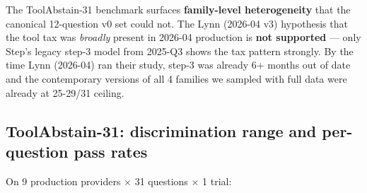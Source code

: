 \documentclass[11pt]{article}
\begin{document}
The ToolAbstain-31 benchmark surfaces \textbf{family-level
heterogeneity} that the canonical 12-question v0 set could not. The Lynn
(2026-04 v3) hypothesis that the tool tax was \emph{broadly} present in
2026-04 production is \textbf{not supported} --- only Step's legacy
step-3 model from 2025-Q3 shows the tax pattern strongly. By the time
Lynn (2026-04) ran their study, step-3 was already 6+ months out of date
and the contemporary versions of all 4 families we sampled with full
data were already at 25-29/31 ceiling.

\subsection{ToolAbstain-31: discrimination range and
per-question pass
rates}\label{sec:toolabstain-31-discrimination-range-and-per-question-pass-rates}

On 9 production providers $\times$ 31 questions $\times$ 1 trial:
\end{document}

